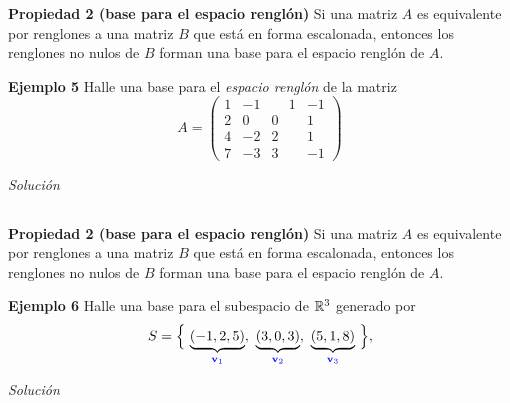 \begin{frame}%

\begin{prop}{\textbf{Propiedad 2 (base para el espacio renglón)}}
	\justifying
	Si una matriz $A$ es equivalente por renglones a una matriz $B$ que está en forma escalonada,
	entonces los renglones no nulos de $B$ forman una base para el espacio renglón de $A$.
\end{prop}	


\begin{ej}{\textbf{Ejemplo  5}}
	Halle una base para el \textit{espacio renglón} de la matriz
	\[
	A = 
	\left( 
	\begin{array}{rrrr}	
	1 & -1 & \phantom{-}1 & -1 \\[1mm]
	2 &  0 & 0 & 1 \\[1mm]
	4 & -2 & 2 & 1 \\[1mm]
	7 & -3 & 3 & -1
	\end{array} 
	\right)
	\]
\end{ej}
\textit{Solución}

\end{frame}


\subsection{}

\begin{frame}%

\begin{prop}{\textbf{Propiedad 2 (base para el espacio renglón)}}
	\justifying
	Si una matriz $A$ es equivalente por renglones a una matriz $B$ que está en forma escalonada,
	entonces los renglones no nulos de $B$ forman una base para el espacio renglón de $A$.
\end{prop}	


\begin{ej}{\textbf{Ejemplo  6}}
	Halle una base para el subespacio de $\mathbb{R}^3$ generado por
	\[
	S = \Big\{ \, \underbrace{(-1,2,5)}_{\color{blue}\mathbf{v}_1}, \ \underbrace{(3,0,3)}_{\color{blue}\mathbf{v}_2}, \ 
	\underbrace{(5,1,8)}_{\color{blue}\mathbf{v}_3} \, \Big\},
	\]
\end{ej}
\textit{Solución}

\end{frame}

